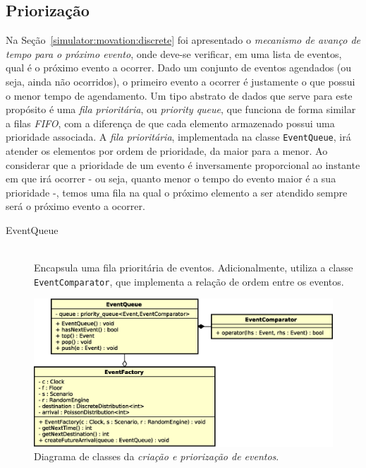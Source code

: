 \subsection{Priorização} \label{model:queue}

Na Seção~\ref{simulator:movation:discrete} foi apresentado o \textit{mecanismo
de avanço de tempo para o próximo evento}, onde deve-se verificar, em uma lista
de eventos, qual é o próximo evento a ocorrer. Dado um conjunto de eventos
agendados (ou seja, ainda não ocorridos), o primeiro evento a ocorrer é
justamente o que possui o menor tempo de agendamento. Um tipo abstrato de dados
que serve para este propósito é uma \textit{fila prioritária}, ou
\textit{priority queue}, que funciona de forma similar a filas \textit{FIFO},
com a diferença de que cada elemento armazenado possui uma prioridade associada.
A \textit{fila prioritária}, implementada na classe \texttt{EventQueue}, irá
atender os elementos por ordem de prioridade, da maior para a menor. Ao
considerar que a prioridade de um evento é inversamente proporcional ao instante
em que irá ocorrer - ou seja, quanto menor o tempo do evento maior é a sua
prioridade -, temos uma fila na qual o próximo elemento a ser atendido sempre
será o próximo evento a ocorrer.

\begin{description}
  \item[EventQueue] \hfill \\
    Encapsula uma fila prioritária de eventos. Adicionalmente, utiliza a classe
    \texttt{EventComparator}, que implementa a relação de ordem entre os
    eventos.

\end{description}

\begin{figure}[htb!]
  \centering
  \includegraphics[scale=0.6]{img/EventQueue}
  \caption{Diagrama de classes da \textit{criação e priorização de eventos}.}
\label{fig:diagram:event:manage}
\end{figure}

